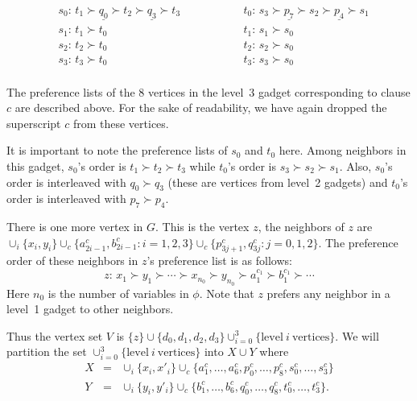 \documentclass{llncs}
\begin{document}
\begin{minipage}[c]{0.45\textwidth}
			
			\centering
			\begin{align*}
				&s_0\colon \, t_1  \succ \underline{q_0} \succ t_2\succ \underline{q_3} \succ t_3 \qquad\qquad && t_0\colon \, s_3  \succ \underline{p_7} \succ s_2\succ  \underline{p_4} \succ s_1 \\
			        &s_1\colon \, t_1 \succ t_0  \qquad\qquad && t_1\colon \, s_1 \succ s_0 \\
                                &s_2\colon \, t_2 \succ t_0  \qquad\qquad && t_2\colon \, s_2 \succ s_0 \\
                                &s_3\colon \, t_3 \succ t_0  \qquad\qquad && t_3\colon \, s_3 \succ s_0 \\
			\end{align*}
\end{minipage}

The preference lists of the 8 vertices in the level~3 gadget corresponding to clause $c$ are described above.
For the sake of readability, we have again dropped the superscript $c$ from these vertices. 

It is important to note the preference lists of $s_0$ and $t_0$ here.
Among neighbors in this gadget, $s_0$'s order is $t_1 \succ t_2 \succ t_3$ while
$t_0$'s order is $s_3 \succ s_2 \succ s_1$. Also, $s_0$'s order is interleaved with $q_0 \succ q_3$ (these are vertices from level~2 gadgets) and
$t_0$'s order is interleaved with $p_7 \succ p_4$.

\medskip

There is one more vertex in $G$. This is the vertex $z$, the neighbors of $z$ are $\cup_i \{x_i,y_i\} \cup_c \{a^c_{2i-1},b^c_{2i-1}: i = 1,2,3\} \cup_c \{p^c_{3j+1},q^c_{3j}: j=0,1,2\}$.
The preference order of these neighbors in $z$'s preference list is as follows:
\[z\colon \, x_1  \succ y_1 \succ \cdots \succ x_{n_0} \succ y_{n_0} \succ a^{c_1}_1 \succ b^{c_1}_1 \succ \cdots \]
Here $n_0$ is  the number of variables in $\phi$. Note that
$z$ prefers any neighbor in a level~1 gadget to other neighbors. %

Thus the vertex set $V$ is $\{z\} \cup \{d_0,d_1,d_2,d_3\} \cup_{i=0}^3 \{\mathrm{level}\ i \ \mathrm{vertices}\}$.
We will partition the set $\cup_{i=0}^3\{\mathrm{level}\ i \ \mathrm{vertices}\}$ into $X \cup Y$ where
\begin{eqnarray*}
X & = & \cup_i\{x_i,x'_i\} \cup_c \{a^c_1,\ldots,a^c_6,p^c_0,\ldots,p^c_8,s^c_0,\ldots,s^c_3\}\\
Y & = & \cup_i\{y_i,y'_i\} \cup_c \{b^c_1,\ldots,b^c_6,q^c_0,\ldots,q^c_8,t^c_0,\ldots,t^c_3\}.
\end{eqnarray*}
\end{document}
